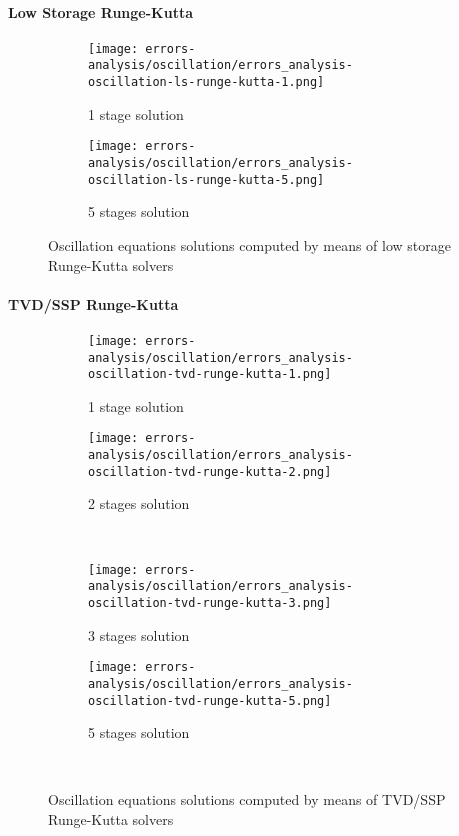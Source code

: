 \documentclass[pdftex,preprint,3p,times,numbers]{elsarticle}
\begin{document}
\paragraph{Low Storage Runge-Kutta}

\begin{figure}[!ht]
  \centering
  \begin{subfigure}[b]{0.45\textwidth}
    \centering
    \texttt{[image: errors-analysis/oscillation/errors\_analysis-oscillation-ls-runge-kutta-1.png]}
    \caption{1 stage solution}\label{fig:results-oscillation-ls-runge-kutta-1}
  \end{subfigure}\quad%
  \begin{subfigure}[b]{0.45\textwidth}
    \centering
    \texttt{[image: errors-analysis/oscillation/errors\_analysis-oscillation-ls-runge-kutta-5.png]}
    \caption{5 stages solution}\label{fig:results-oscillation-ls-runge-kutta-5}
  \end{subfigure}
  \caption{Oscillation equations solutions computed by means of low storage Runge-Kutta solvers}\label{fig:results-oscillation-ls-runge-kutta}
\end{figure}

\paragraph{TVD/SSP Runge-Kutta}

\begin{figure}[!ht]
  \centering
  \begin{subfigure}[b]{0.45\textwidth}
    \centering
    \texttt{[image: errors-analysis/oscillation/errors\_analysis-oscillation-tvd-runge-kutta-1.png]}
    \caption{1 stage solution}\label{fig:results-oscillation-tvd-runge-kutta-1}
  \end{subfigure}\quad%
  \begin{subfigure}[b]{0.45\textwidth}
    \centering
    \texttt{[image: errors-analysis/oscillation/errors\_analysis-oscillation-tvd-runge-kutta-2.png]}
    \caption{2 stages solution}\label{fig:results-oscillation-tvd-runge-kutta-2}
  \end{subfigure}\\
  \begin{subfigure}[b]{0.45\textwidth}
    \centering
    \texttt{[image: errors-analysis/oscillation/errors\_analysis-oscillation-tvd-runge-kutta-3.png]}
    \caption{3 stages solution}\label{fig:results-oscillation-tvd-runge-kutta-3}
  \end{subfigure}\quad%
  \begin{subfigure}[b]{0.45\textwidth}
    \centering
    \texttt{[image: errors-analysis/oscillation/errors\_analysis-oscillation-tvd-runge-kutta-5.png]}
    \caption{5 stages solution}\label{fig:results-oscillation-tvd-runge-kutta-5}
  \end{subfigure}\\
  \caption{Oscillation equations solutions computed by means of TVD/SSP Runge-Kutta solvers}\label{fig:results-oscillation-tvd-runge-kutta}
\end{figure}
\end{document}

